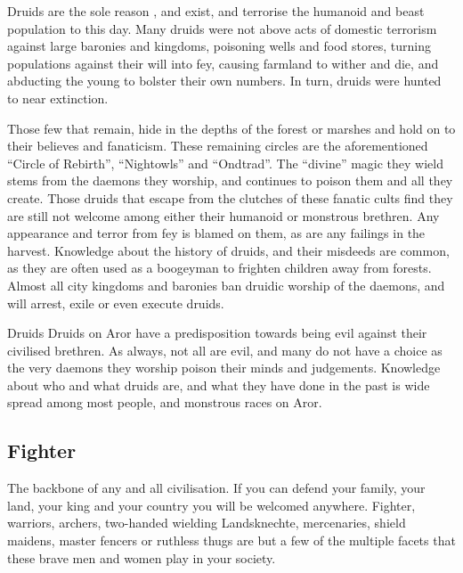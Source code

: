 Druids are the sole reason , and 
exist, and terrorise the humanoid and beast population to this day. Many
druids were not above acts of domestic terrorism against large baronies and
kingdoms, poisoning wells and food stores, turning populations against their
will into fey, causing farmland to wither and die, and abducting the young to
bolster their own numbers. In turn, druids were hunted to near extinction.

Those few that remain, hide in the depths of the forest or marshes and hold on
to their believes and fanaticism. These remaining circles are the aforementioned
``Circle of Rebirth'', ``Nightowls'' and ``Ondtrad''. The ``divine'' magic they
wield stems from the daemons they worship, and continues to poison them and all
they create. Those druids that escape from the clutches of these fanatic cults
find they are still not welcome among either their humanoid or monstrous
brethren. Any appearance and terror from fey is blamed on them, as are any
failings in the harvest. Knowledge about the history of druids, and their
misdeeds are common, as they are often used as a boogeyman to frighten
children away from forests. Almost all city kingdoms and baronies ban druidic
worship of the daemons, and will arrest, exile or even execute druids.


\begin{35e}{Druids}
  Druids on Aror have a predisposition towards being evil against their
  civilised brethren. As always, not all are evil, and many do not have a
  choice as the very daemons they worship poison their minds and judgements.
  Knowledge about who and what druids are, and what they have done in the
  past is wide spread among most people, and monstrous races on Aror.
\end{35e}

\subsection{Fighter}
\label{sec:Fighter}

The backbone of any and all civilisation. If you can defend your family, your
land, your king and your country you will be welcomed anywhere. Fighter,
warriors, archers, two-handed wielding Landsknechte, mercenaries, shield
maidens, master fencers or ruthless thugs are but a few of the multiple
facets that these brave men and women play in your society.

